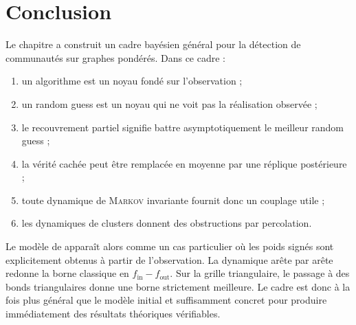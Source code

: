 \section{Conclusion}
\label{sec:chapII_conclusion}

Le chapitre a construit un cadre bayésien général pour la détection de communautés sur graphes pondérés. Dans ce cadre :
\begin{enumerate}
    \item un algorithme est un noyau fondé sur l'observation ;
    \item un random guess est un noyau qui ne voit pas la réalisation observée ;
    \item le recouvrement partiel signifie battre asymptotiquement le meilleur random guess ;
    \item la vérité cachée peut être remplacée en moyenne par une réplique postérieure ;
    \item toute dynamique de \textsc{Markov} invariante fournit donc un couplage utile ;
    \item les dynamiques de clusters donnent des obstructions par percolation.
\end{enumerate}

Le modèle de \SB{} apparaît alors comme un cas particulier où les poids signés sont explicitement obtenus à partir de l'observation. La dynamique \SW{} arête par arête redonne la borne classique en $f_{\mathrm{in}}-f_{\mathrm{out}}$. Sur la grille triangulaire, le passage à des bonds triangulaires donne une borne strictement meilleure. Le cadre est donc à la fois plus général que le modèle initial et suffisamment concret pour produire immédiatement des résultats théoriques vérifiables.

